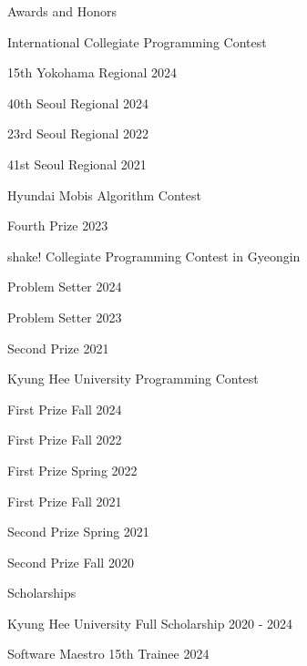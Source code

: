 \documentclass{resume}
\begin{document}
\begin{rSection}{Awards and Honors}

  \begin{rSubsection}{International Collegiate Programming Contest}{}{}{}
    \item 15th \hfill Yokohama Regional 2024
    \item 40th \hfill Seoul Regional 2024
    \item 23rd \hfill Seoul Regional 2022
    \item 41st \hfill Seoul Regional 2021
  \end{rSubsection}

  \begin{rSubsection}{Hyundai Mobis Algorithm Contest}{}{}{}
    \item Fourth Prize \hfill 2023
  \end{rSubsection}

  \begin{rSubsection}{shake! Collegiate Programming Contest in Gyeongin}{}{}{}
    \item Problem Setter \hfill 2024
    \item Problem Setter \hfill 2023
    \item Second Prize \hfill 2021
  \end{rSubsection}

  \begin{rSubsection}{Kyung Hee University Programming Contest}{}{}{}
    \item First Prize \hfill Fall 2024
    \item First Prize \hfill Fall 2022
    \item First Prize \hfill Spring 2022
    \item First Prize \hfill Fall 2021
    \item Second Prize \hfill Spring 2021
    \item Second Prize \hfill Fall 2020
  \end{rSubsection}

  \begin{rSubsection}{Scholarships}{}{}{}
    \item Kyung Hee University Full Scholarship \hfill 2020 - 2024
    \item Software Maestro 15th Trainee \hfill 2024
  \end{rSubsection}


\end{rSection}
\end{document}
